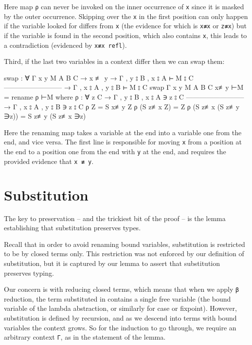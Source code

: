 Here map \texttt{ρ} can never be invoked on the inner occurrence of
\texttt{x} since it is masked by the outer occurrence. Skipping over the
\texttt{x} in the first position can only happen if the variable looked
for differs from \texttt{x} (the evidence for which is \texttt{x≢x} or
\texttt{z≢x}) but if the variable is found in the second position, which
also contains \texttt{x}, this leads to a contradiction (evidenced by
\texttt{x≢x\ refl}).

Third, if the last two variables in a context differ then we can swap
them:

\begin{fence}
\begin{code}
swap : ∀ {Γ x y M A B C}
  → x ≢ y
  → Γ , y ⦂ B , x ⦂ A ⊢ M ⦂ C
    --------------------------
  → Γ , x ⦂ A , y ⦂ B ⊢ M ⦂ C
swap {Γ} {x} {y} {M} {A} {B} {C} x≢y ⊢M = rename ρ ⊢M
  where
  ρ : ∀ {z C}
    → Γ , y ⦂ B , x ⦂ A ∋ z ⦂ C
      --------------------------
    → Γ , x ⦂ A , y ⦂ B ∋ z ⦂ C
  ρ Z                   =  S x≢y Z
  ρ (S z≢x Z)           =  Z
  ρ (S z≢x (S z≢y ∋z))  =  S z≢y (S z≢x ∋z)
\end{code}
\end{fence}

Here the renaming map takes a variable at the end into a variable one
from the end, and vice versa. The first line is responsible for moving
\texttt{x} from a position at the end to a position one from the end
with \texttt{y} at the end, and requires the provided evidence that
\texttt{x\ ≢\ y}.

\hypertarget{substitution}{%
\section{Substitution}\label{substitution}}

The key to preservation -- and the trickiest bit of the proof -- is the
lemma establishing that substitution preserves types.

Recall that in order to avoid renaming bound variables, substitution is
restricted to be by closed terms only. This restriction was not enforced
by our definition of substitution, but it is captured by our lemma to
assert that substitution preserves typing.

Our concern is with reducing closed terms, which means that when we
apply \texttt{β} reduction, the term substituted in contains a single
free variable (the bound variable of the lambda abstraction, or
similarly for case or fixpoint). However, substitution is defined by
recursion, and as we descend into terms with bound variables the context
grows. So for the induction to go through, we require an arbitrary
context \texttt{Γ}, as in the statement of the lemma.

